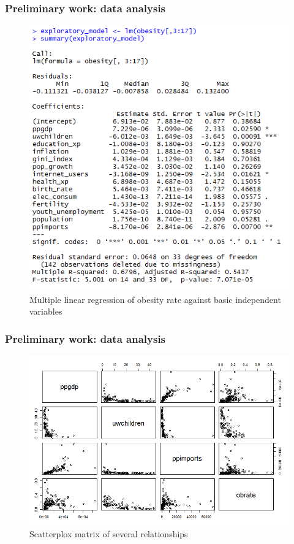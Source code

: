 \documentclass{beamer}
\begin{document}
\begin{frame}
\frametitle{Preliminary work: data analysis}
\begin{figure}
\label{fig:multireg}
\caption{Multiple linear regression of obesity rate against basic independent variables}
\centering
\includegraphics[scale=0.9]{multi_regression.PNG}
\end{figure}
\end{frame}

\begin{frame}
\frametitle{Preliminary work: data analysis}
\begin{figure}
\label{fig:scatter}
\caption{Scatterplox matrix of several relationships}
\centering
\includegraphics[scale=0.65]{scatter_matrix.PNG}
\end{figure}
\end{frame}
\end{document}
